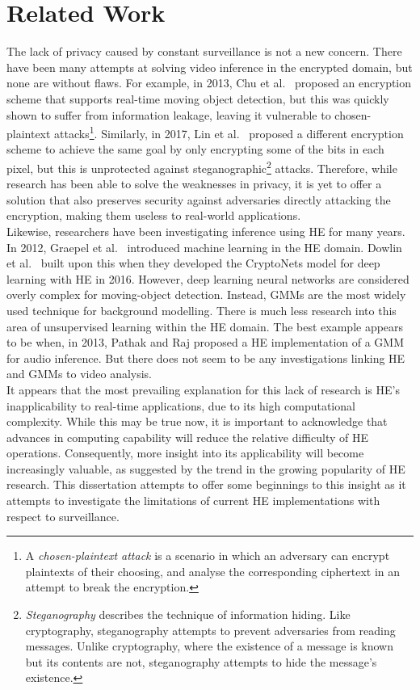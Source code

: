\section{Related Work}
\label{sec:relatedWork}
\setlength{\leftskip}{0.25cm}
\indent \indent
The lack of privacy caused by constant surveillance is not a new concern. There have been many attempts at solving video inference in the encrypted domain, but none are without flaws. For example, in 2013, Chu et al.\ \cite{Chu} proposed an encryption scheme that supports real-time moving object detection, but this was quickly shown to suffer from information leakage, leaving it vulnerable to chosen-plaintext attacks\footnote{ A \textit{chosen-plaintext attack} is a scenario in which an adversary can encrypt plaintexts of their choosing, and analyse the corresponding ciphertext in an attempt to break the encryption. }. Similarly, in 2017, Lin et al.\ \cite{Lin} proposed a different encryption scheme to achieve the same goal by only encrypting some of the bits in each pixel, but this is unprotected against steganographic\footnote{\textit{Steganography} describes the technique of information hiding. Like cryptography, steganography attempts to prevent adversaries from reading messages. Unlike cryptography, where the existence of a message is known but its contents are not, steganography attempts to hide the message's existence.} attacks. Therefore, while research has been able to solve the weaknesses in privacy, it is yet to offer a solution that also preserves security against adversaries directly attacking the encryption, making them useless to real-world applications.
\smallskip \\ \indent
Likewise, researchers have been investigating inference using HE for many years. In 2012, Graepel et al.\ \cite{Graepel} introduced machine learning in the HE domain. Dowlin et al.\ \cite{Graepel} built upon this when they developed the CryptoNets model for deep learning with HE in 2016. However, deep learning neural networks are considered overly complex for moving-object detection. Instead, GMMs are the most widely used technique for background modelling. There is much less research into this area of unsupervised learning within the HE domain. The best example appears to be when, in 2013, Pathak and Raj \cite{Pathak} proposed a HE implementation of a GMM for audio inference. But there does not seem to be any investigations linking HE and GMMs to video analysis.
\smallskip \\ \indent
It appears that the most prevailing explanation for this lack of research is HE's inapplicability to real-time applications, due to its high computational complexity. While this may be true now, it is important to acknowledge that advances in computing capability will reduce the relative difficulty of HE operations. Consequently, more insight into its applicability will become increasingly valuable, as suggested by the trend in the growing popularity of HE research. This dissertation attempts to offer some beginnings to this insight as it attempts to investigate the limitations of current HE implementations with respect to surveillance.

